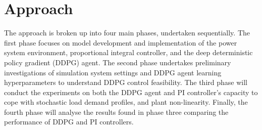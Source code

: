 \chapter{Approach}
The approach is broken up into four main phases, undertaken sequentially. The first phase focuses on model development and implementation of the power system environment, proportional integral controller, and the deep deterministic policy gradient (DDPG) agent. The second phase undertakes preliminary investigations of simulation system settings and DDPG agent learning hyperparameters to understand DDPG control feasibility. The third phase will conduct the experiments on both the DDPG agent and PI controller's capacity to cope with stochastic load demand profiles, and plant non-linearity. Finally, the fourth phase will analyse the results found in phase three comparing the performance of DDPG and PI controllers.












